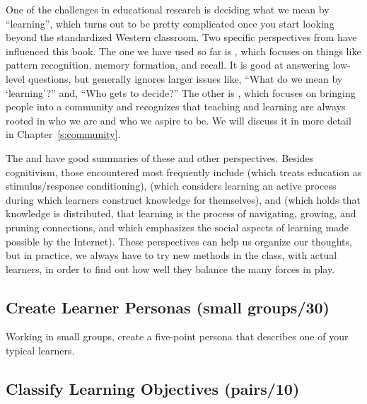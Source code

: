 
One of the challenges in educational research is deciding what we mean by ``learning'',
which turns out to be pretty complicated
once you start looking beyond the standardized Western classroom.
Two specific perspectives from 
have influenced this book.
The one we have used so far is ,
which focuses on things like pattern recognition, memory formation, and recall.
It is good at answering low-level questions,
but generally ignores larger issues like,
``What do we mean by `learning'?'' and, ``Who gets to decide?''
The other is ,
which focuses on bringing people into a community
and recognizes that
teaching and learning are always rooted in who we are and who we aspire to be.
We will discuss it in more detail in Chapter~\ref{s:community}.

The  and \cite{Wibu2016}
have good summaries of these and other perspectives.
Besides cognitivism,
those encountered most frequently include 
(which treats education as stimulus/response conditioning),
(which considers learning an active process during which learners construct knowledge for themselves),
and 
(which holds that knowledge is distributed,
that learning is the process of navigating, growing, and pruning connections,
and which emphasizes the social aspects of learning made possible by the Internet).
These perspectives can help us organize our thoughts,
but in practice,
we always have to try new methods in the class,
with actual learners,
in order to find out how well they balance the many forces in play.


\subsection*{Create Learner Personas (small groups/30)}

Working in small groups, create a five-point persona that describes one
of your typical learners.

\subsection*{Classify Learning Objectives (pairs/10)}

